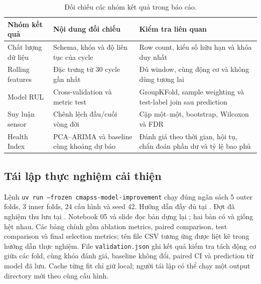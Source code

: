 \begin{table}[H]
\centering
\caption[Đối chiếu kết quả]{Đối chiếu các nhóm kết quả trong báo cáo.}
\label{tab:result-map}
\small
\begin{tabular}{L{4.2cm}L{5.2cm}L{5.1cm}}
\toprule
Nhóm kết quả & Nội dung đối chiếu & Kiểm tra liên quan \\\midrule
Chất lượng dữ liệu & Schema, khóa và độ liên tục của cycle & Row count, kiểu số hữu hạn và khóa duy nhất \\
Rolling features & Đặc trưng từ 30 cycle gần nhất & Đủ window, cùng động cơ và không dùng tương lai \\
Model RUL & Cross-validation và metric test & GroupKFold, sample weighting và test-label join sau prediction \\
Suy luận sensor & Chênh lệch đầu/cuối vòng đời & Cặp một--một, bootstrap, Wilcoxon và FDR \\
Health Index & PCA--ARIMA và baseline cùng khoảng dự báo & Đánh giá theo thời gian, hội tụ, chẩn đoán phần dư và tỷ lệ bao phủ \\
\bottomrule
\end{tabular}
\end{table}

\subsection{Tái lập thực nghiệm cải thiện}
Lệnh \texttt{uv run --frozen cmapss-model-improvement} chạy đúng ngân sách
5 outer folds, 3 inner folds, 24 cấu hình và seed 42. Hướng dẫn đầy đủ tại
. Đợt đã nghiệm thu lưu tại
. Notebook 05 và
slide đọc bản dựng lại ; hai bản có
 và  giống hệt nhau.
Các bảng chính gồm ablation metrics, paired comparison, test comparison
và final selection metrics; tên file CSV tương ứng được liệt kê trong hướng
dẫn thực nghiệm. File \texttt{validation.json}
ghi kết quả kiểm tra tách động cơ giữa các fold, cùng khóa đánh giá, baseline không
đổi, paired CI và prediction từ model đã lưu. Cache từng fit chỉ giữ local;
người tái lập có thể chạy một output directory mới theo cùng cấu hình.
